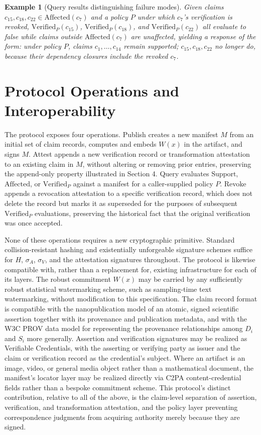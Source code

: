 \documentclass[11pt]{article}
\newtheorem{example}{Example}
\begin{document}
\begin{example}[Query results distinguishing failure modes]
Given claims $c_{15}, c_{18}, c_{22} \in \mathrm{Affected}(c_7)$ and a policy $P$ under which $c_7$'s verification is revoked, $\mathrm{Verified}_P(c_{15})$, $\mathrm{Verified}_P(c_{18})$, and $\mathrm{Verified}_P(c_{22})$ all evaluate to false while claims outside $\mathrm{Affected}(c_7)$ are unaffected, yielding a response of the form: under policy $P$, claims $c_1, \ldots, c_{14}$ remain supported; $c_{15}, c_{18}, c_{22}$ no longer do, because their dependency closures include the revoked $c_7$.
\end{example}

\section{Protocol Operations and Interoperability}

The protocol exposes four operations. \textsf{Publish} creates a new manifest $M$ from an initial set of claim records, computes and embeds $W(x)$ in the artifact, and signs $M$. \textsf{Attest} appends a new verification record or transformation attestation to an existing claim in $M$, without altering or removing prior entries, preserving the append-only property illustrated in Section 4. \textsf{Query} evaluates $\mathrm{Support}$, $\mathrm{Affected}$, or $\mathrm{Verified}_P$ against a manifest for a caller-supplied policy $P$. \textsf{Revoke} appends a revocation attestation to a specific verification record, which does not delete the record but marks it as superseded for the purposes of subsequent $\mathrm{Verified}_P$ evaluations, preserving the historical fact that the original verification was once accepted.

None of these operations requires a new cryptographic primitive. Standard collision-resistant hashing and existentially unforgeable signature schemes suffice for $H$, $\sigma_A$, $\sigma_V$, and the attestation signatures throughout. The protocol is likewise compatible with, rather than a replacement for, existing infrastructure for each of its layers. The robust commitment $W(x)$ may be carried by any sufficiently robust statistical watermarking scheme, such as sampling-time text watermarking, without modification to this specification. The claim record format is compatible with the nanopublication model of an atomic, signed scientific assertion together with its provenance and publication metadata, and with the W3C PROV data model for representing the provenance relationships among $D_i$ and $S_i$ more generally. Assertion and verification signatures may be realized as Verifiable Credentials, with the asserting or verifying party as issuer and the claim or verification record as the credential's subject. Where an artifact is an image, video, or general media object rather than a mathematical document, the manifest's locator layer may be realized directly via C2PA content-credential fields rather than a bespoke commitment scheme. This protocol's distinct contribution, relative to all of the above, is the claim-level separation of assertion, verification, and transformation attestation, and the policy layer preventing correspondence judgments from acquiring authority merely because they are signed.
\end{document}
